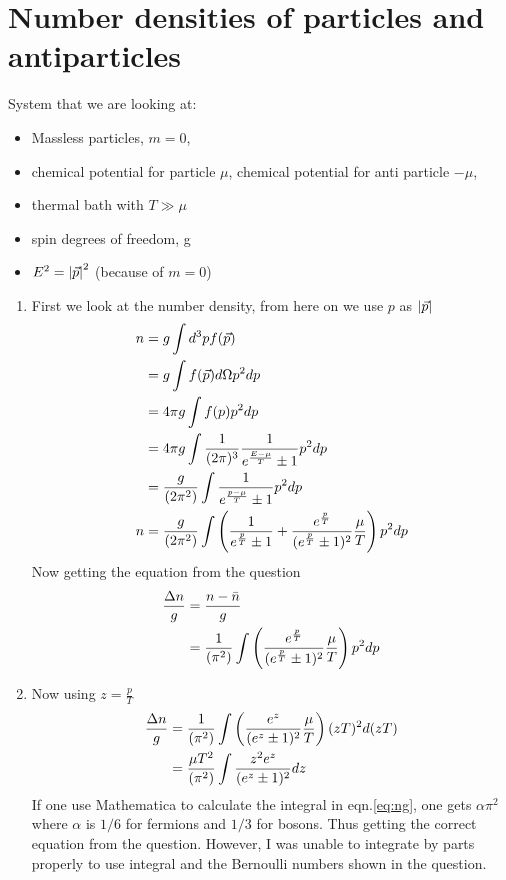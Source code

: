 \section{Number densities of particles and antiparticles}
System that we are looking at: 
\begin{itemize}
\item Massless particles, $m=0$,
\item chemical potential for particle $\mu$, chemical potential for anti particle $-\mu$,
\item thermal bath with $T \gg \mu$
\item spin degrees of freedom, g
\item $E^2 = \abs{\vec{p}}^2$ (because of $m=0$)
\end{itemize}
\begin{enumerate}[label=(\alph*)]
\item First we look at the number density, from here on we use $p$ as $\abs{\vec{p}}$ 
\begin{align}
n 	&= g \int d^{3} p f( \vec{p} ) \\ \notag 
	&= g \int 	f(\vec{p}) d\Omega p^2 dp \notag \\
	&= 4\pi g \int 	f(p) p^2 dp \notag  \\ 
	&= 4\pi g \int 	\frac{1}{(2\pi)^3} \frac{1}{e^{\frac{E-\mu}{T}}\pm 1}p^2 dp \notag  \\ 
	&= \frac{g}{(2\pi^2)} \int \frac{1}{e^{\frac{p-\mu}{T}}\pm 1}p^2 dp \notag \\ 
n 	&= \frac{g}{(2\pi^2)} \int \left( \frac{1}{e^{\frac{p}{T}}\pm 1} + \frac{e^{\frac{p}{T}}}{(e^{\frac{p}{T}}\pm 1)^2}\frac{\mu}{T}\right)p^2 dp  
\end{align}
Now getting the equation from the question
\begin{align}
\frac{\Delta n}{g} 	&= \frac{n-\bar{n}}{g} \\ \notag
				&= \frac{1}{(\pi^2)} \int \left( \frac{e^{\frac{p}{T}}}{(e^{\frac{p}{T}}\pm 1)^2}\frac{\mu}{T}\right)p^2 dp \notag
\end{align}
\item  Now using $z=\frac{p}{T}$
\begin{align}\label{eq:ng}
\frac{\Delta n}{g}	&= \frac{1}{(\pi^2)} \int \left( \frac{e^{z}}{(e^{z}\pm 1)^2} \frac{\mu}{T} \right)(zT)^2 d(zT) \notag \\ 
				&= \frac{\mu T^2}{(\pi^2)} \int \frac{z^2 e^{z}}{(e^{z} \pm 1)^2} dz 
\end{align}
If one use Mathematica to calculate the integral in eqn.\ref{eq:ng}, one gets $\alpha\pi^2$ where $\alpha $ is $1/6$ for fermions and $1/3$ for bosons. Thus getting the correct equation from the question. However, I was unable to integrate by parts properly to use integral and the Bernoulli numbers shown in the question.
\end{enumerate}

